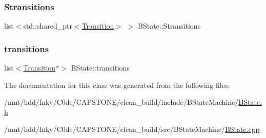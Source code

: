 \subsubsection{\texorpdfstring{Stransitions}{Stransitions}}
{\footnotesize\ttfamily list$<$std\+::shared\+\_\+ptr$<$\hyperlink{classTransition}{Transition}$>$ $>$ B\+State\+::\+Stransitions\hspace{0.3cm}{\ttfamily [private]}}

\mbox{\label{classBState_a9bd20e613fd32ef9408818eb15f80350}} 
\subsubsection{\texorpdfstring{transitions}{transitions}}
{\footnotesize\ttfamily list$<$\hyperlink{classTransition}{Transition}$\ast$$>$ B\+State\+::transitions\hspace{0.3cm}{\ttfamily [private]}}



The documentation for this class was generated from the following files\+:\begin{DoxyCompactItemize}
\item 
/mnt/hdd/fnky/\+C0de/\+C\+A\+P\+S\+T\+O\+N\+E/clean\+\_\+build/include/\+B\+State\+Machine/\hyperlink{BState_8h}{B\+State.\+h}\item 
/mnt/hdd/fnky/\+C0de/\+C\+A\+P\+S\+T\+O\+N\+E/clean\+\_\+build/src/\+B\+State\+Machine/\hyperlink{BState_8cpp}{B\+State.\+cpp}\end{DoxyCompactItemize}
